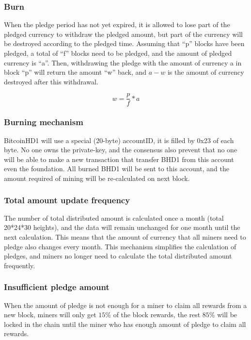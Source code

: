 \subsubsection{Burn}
\begin{flushleft}
    When the pledge period has not yet expired, it is allowed to lose part of the pledged currency to withdraw the pledged amount, but part of the currency will be destroyed according to the pledged time. Assuming that ``p'' blocks have been pledged, a total of ``f'' blocks need to be pledged, and the amount of pledged currency is ``a''. Then, withdrawing the pledge with the amount of currency a in block ``p'' will return the amount ``w'' back, and $a-w$ is the amount of currency destroyed after this withdrawal.
\end{flushleft}
\begin{equation}
    w = \frac{p}{f} * a
\end{equation}
\subsubsection{Burning mechanism}
\begin{flushleft}
    BitcoinHD1 will use a special (20-byte) accountID, it is filled by 0x23 of each byte. No one owns the private-key, and the consensus also prevent that no one will be able to make a new transaction that transfer BHD1 from this account even the foundation. All burned BHD1 will be sent to this account, and the amount required of mining will be re-calculated on next block.
\end{flushleft}
\subsubsection{Total amount update frequency}
\begin{flushleft}
    The number of total distributed amount is calculated once a month (total 20*24*30 heights), and the data will remain unchanged for one month until the next calculation. This means that the amount of currency that all miners need to pledge also changes every month. This mechanism simplifies the calculation of pledges, and miners no longer need to calculate the total distributed amount frequently.
\end{flushleft}
\subsubsection{Insufficient pledge amount}
\begin{flushleft}
    When the amount of pledge is not enough for a miner to claim all rewards from a new block, miners will only get $15\%$ of the block rewards, the rest $85\%$ will be locked in the chain until the miner who has enough amount of pledge to claim all rewards.
\end{flushleft}
